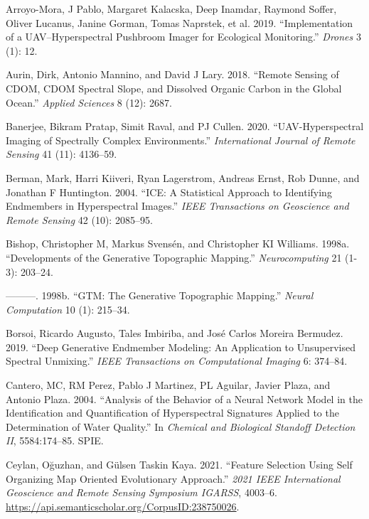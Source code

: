\documentclass[
  letterpaper,
  DIV=11,
  numbers=noendperiod]{scrartcl}
\newlength{\cslhangindent}
\newenvironment{CSLReferences}[2] %
 {\begin{list}{}{%
  \setlength{\itemindent}{0pt}
  \setlength{\leftmargin}{0pt}
  \setlength{\parsep}{0pt}
  \ifodd #1
   \setlength{\leftmargin}{\cslhangindent}
   \setlength{\itemindent}{-1\cslhangindent}
  \fi
  \setlength{\itemsep}{#2\baselineskip}}}
 {\end{list}}
\begin{document}
\label{refs}
\begin{CSLReferences}{1}{0}
Arroyo-Mora, J Pablo, Margaret Kalacska, Deep Inamdar, Raymond Soffer,
Oliver Lucanus, Janine Gorman, Tomas Naprstek, et al. 2019.
{``Implementation of a UAV--Hyperspectral Pushbroom Imager for
Ecological Monitoring.''} \emph{Drones} 3 (1): 12.

Aurin, Dirk, Antonio Mannino, and David J Lary. 2018. {``Remote Sensing
of CDOM, CDOM Spectral Slope, and Dissolved Organic Carbon in the Global
Ocean.''} \emph{Applied Sciences} 8 (12): 2687.

Banerjee, Bikram Pratap, Simit Raval, and PJ Cullen. 2020.
{``UAV-Hyperspectral Imaging of Spectrally Complex Environments.''}
\emph{International Journal of Remote Sensing} 41 (11): 4136--59.

Berman, Mark, Harri Kiiveri, Ryan Lagerstrom, Andreas Ernst, Rob Dunne,
and Jonathan F Huntington. 2004. {``ICE: A Statistical Approach to
Identifying Endmembers in Hyperspectral Images.''} \emph{IEEE
Transactions on Geoscience and Remote Sensing} 42 (10): 2085--95.

Bishop, Christopher M, Markus Svensén, and Christopher KI Williams.
1998a. {``Developments of the Generative Topographic Mapping.''}
\emph{Neurocomputing} 21 (1-3): 203--24.

---------. 1998b. {``GTM: The Generative Topographic Mapping.''}
\emph{Neural Computation} 10 (1): 215--34.

Borsoi, Ricardo Augusto, Tales Imbiriba, and José Carlos Moreira
Bermudez. 2019. {``Deep Generative Endmember Modeling: An Application to
Unsupervised Spectral Unmixing.''} \emph{IEEE Transactions on
Computational Imaging} 6: 374--84.

Cantero, MC, RM Perez, Pablo J Martinez, PL Aguilar, Javier Plaza, and
Antonio Plaza. 2004. {``Analysis of the Behavior of a Neural Network
Model in the Identification and Quantification of Hyperspectral
Signatures Applied to the Determination of Water Quality.''} In
\emph{Chemical and Biological Standoff Detection II}, 5584:174--85.
SPIE.

Ceylan, Oğuzhan, and Gülsen Taskin Kaya. 2021. {``Feature Selection
Using Self Organizing Map Oriented Evolutionary Approach.''} \emph{2021
IEEE International Geoscience and Remote Sensing Symposium IGARSS},
4003--6. \url{https://api.semanticscholar.org/CorpusID:238750026}.


\end{CSLReferences}
\end{document}
